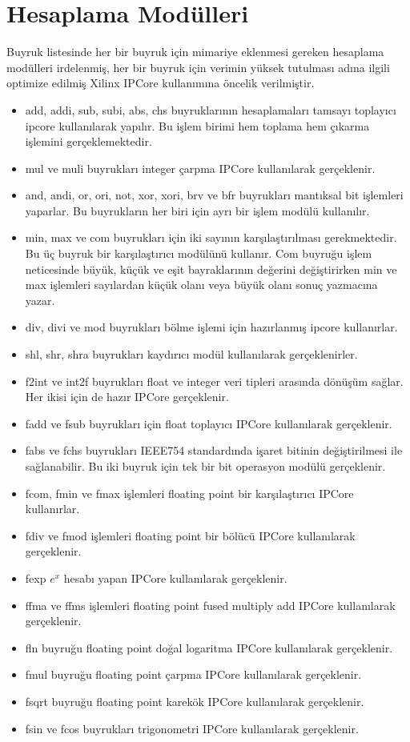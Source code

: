 \section{Hesaplama Modülleri}
Buyruk listesinde her bir buyruk için mimariye eklenmesi gereken hesaplama modülleri irdelenmiş, her bir buyruk için verimin yüksek tutulması adına ilgili optimize edilmiş Xilinx IPCore kullanımına öncelik verilmiştir.\par
\begin{itemize}
\item add, addi, sub, subi, abs, chs buyruklarının hesaplamaları tamsayı toplayıcı ipcore kullanılarak yapılır. Bu işlem birimi hem toplama hem çıkarma işlemini gerçeklemektedir.
\item mul ve muli buyrukları integer çarpma IPCore kullanılarak gerçeklenir.
\item and, andi, or, ori, not, xor, xori, brv ve bfr buyrukları mantıksal bit işlemleri yaparlar. Bu buyrukların her biri için ayrı bir işlem modülü kullanılır.
\item min, max ve com buyrukları için iki sayının karşılaştırılması gerekmektedir. Bu üç buyruk bir karşılaştırıcı modülünü kullanır. Com buyruğu işlem neticesinde büyük, küçük ve eşit bayraklarının değerini değiştirirken min ve max işlemleri sayılardan küçük olanı veya büyük olanı sonuç yazmacına yazar. 
\item div, divi ve mod buyrukları bölme işlemi için hazırlanmış ipcore kullanırlar.  
\item shl, shr, shra buyrukları kaydırıcı modül kullanılarak gerçeklenirler.
\item f2int ve int2f buyrukları float ve integer veri tipleri arasında dönüşüm sağlar. Her ikisi için de hazır IPCore gerçeklenir.
\item fadd ve fsub buyrukları için float toplayıcı IPCore kullanılarak gerçeklenir.
\item fabs ve fchs buyrukları IEEE754 standardında işaret bitinin değiştirilmesi ile sağlanabilir. Bu iki buyruk için tek bir bit operasyon modülü gerçeklenir.
\item fcom, fmin ve fmax işlemleri floating point bir karşılaştırıcı IPCore kullanırlar.
\item fdiv ve fmod işlemleri floating point bir bölücü IPCore kullanılarak gerçeklenir.
\item fexp  $e^{x}$ hesabı yapan IPCore kullanılarak gerçeklenir.
\item ffma ve ffms işlemleri floating point fused multiply add IPCore kullanılarak gerçeklenir.
\item fln buyruğu floating point doğal logaritma IPCore kullanılarak gerçeklenir.
\item fmul buyruğu floating point çarpma IPCore kullanılarak gerçeklenir.
\item fsqrt buyruğu floating point karekök IPCore kullanılarak gerçeklenir.
\item fsin ve fcos buyrukları trigonometri IPCore kullanılarak gerçeklenir.
\end{itemize}

